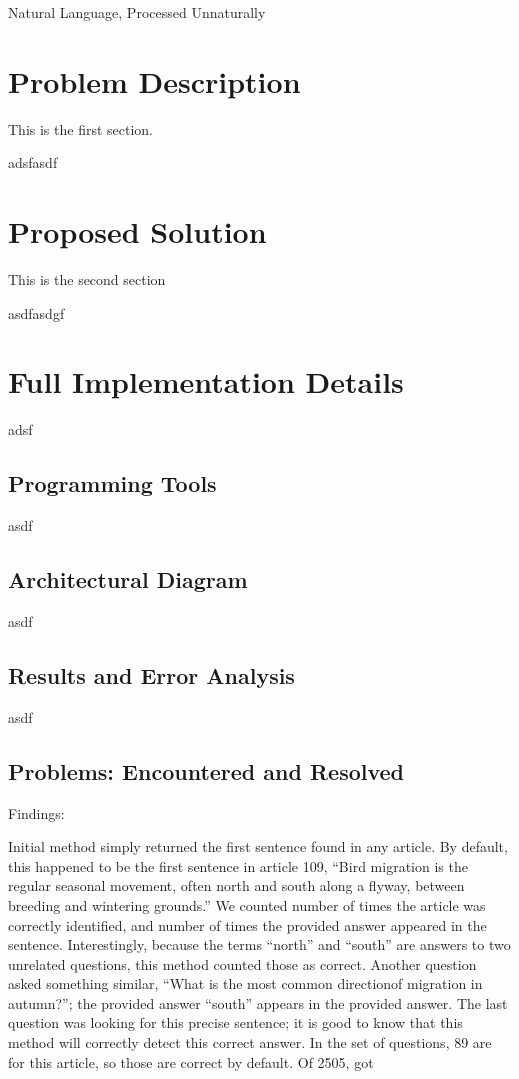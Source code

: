 \documentclass[11pt]{article}
\begin{document}
\HomeworkHeader{}{}%

\begin{center}\huge{Natural Language, Processed Unnaturally}\end{center}

\section{Problem Description}

This is the first section.

adsfasdf

\section{Proposed Solution}

This is the second section

asdfasdgf

\section{Full Implementation Details}

adsf

\subsection{Programming Tools}

asdf

\subsection{Architectural Diagram}

asdf

\subsection{Results and Error Analysis}

asdf

\subsection{Problems: Encountered and Resolved}


Findings:

Initial method simply returned the first sentence found in any article. By default, this happened to be the first sentence in article 109, ``Bird migration is the regular seasonal movement, often north and south along a flyway, between breeding and wintering grounds.'' We counted number of times the article was correctly identified, and number of times the provided answer appeared in the sentence. Interestingly, because the terms ``north'' and ``south'' are answers to two unrelated questions, this method counted those as correct. Another question asked something similar, ``What is the most common directionof migration in autumn?''; the provided answer ``south'' appears in the provided answer. The last question was looking for this precise sentence; it is good to know that this method will correctly detect this correct answer. In the set of questions, 89 are for this article, so those are correct by default. Of 2505, got 
\end{document}

